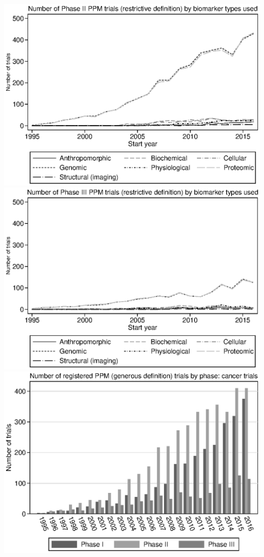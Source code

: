 \includegraphics{../figures/04e-trial_count_by_type_r_ppm_phase_2.eps}
\includegraphics{../figures/04f-trial_count_by_type_r_ppm_phase_3.eps}
\includegraphics{../figures/05a-g_ppm_count_by_phase_cancer.eps}
